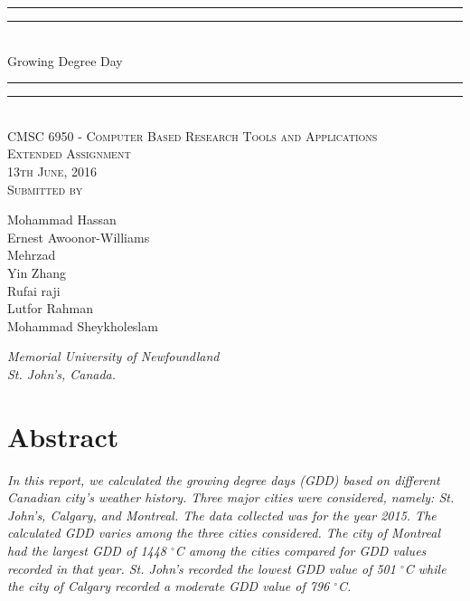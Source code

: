 \documentclass{article}
\begin{document}
{\centering

\rule{\textwidth}{1.6pt}\vspace*{-\baselineskip}\vspace*{2pt} 
\rule{\textwidth}{0.4pt}\\[\baselineskip] 
{\LARGE Growing Degree Day}
\rule{\textwidth}{0.4pt}\vspace*{-\baselineskip}\vspace{3.2pt}
\rule{\textwidth}{1.6pt}\\[\baselineskip] 

\vspace{20mm} %
\scshape %
CMSC 6950 - Computer Based Research Tools and Applications \\ [\baselineskip]
Extended Assignment \\[\baselineskip] 
13th June, 2016 \\[\baselineskip] 
\vspace{20mm} %
Submitted by \\[\baselineskip]
{\Large Mohammad Hassan \\ Ernest Awoonor-Williams \\ Mehrzad \\ Yin Zhang \\ Rufai raji \\ Lutfor Rahman \\ Mohammad Sheykholeslam\par}
\vfill
{\itshape Memorial University of Newfoundland \\ St. John's, Canada.\par} 
}

\newpage

{\centering
  \section*{Abstract}
}

{\itshape In this report, we calculated the growing degree days (GDD) based on different Canadian city's weather history. Three major cities were considered, namely: St. John’s, Calgary, and Montreal. The data collected was for the year 2015. The calculated GDD varies among the three cities considered. The city of Montreal had the largest GDD of 1448 $^{\circ}$C among the cities compared for GDD values recorded in that year. St. John's recorded the lowest GDD value of 501 $^{\circ}$C while the city of Calgary recorded a moderate GDD value of 796 $^{\circ}$C.\\
}
\end{document}
